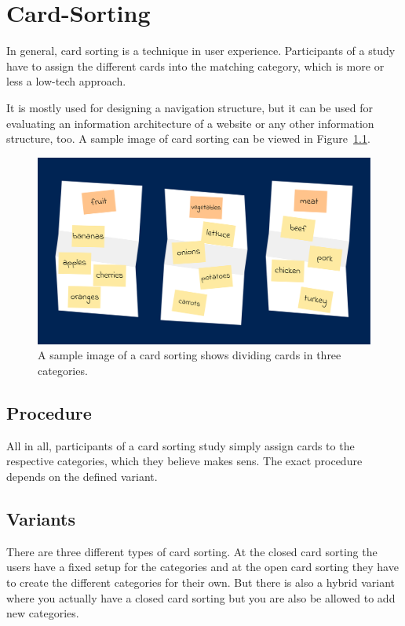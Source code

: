 \chapter{Card-Sorting}
\label{chap:Card-Sorting}

In general, card sorting is a technique in user experience. Participants 
of a study have to assign the different cards into the matching 
category, which is more or less a low-tech approach. 

It is mostly used for designing a navigation structure, but it can be used 
for evaluating an information architecture of a website or any other 
information structure, too.
A sample image of card sorting can be viewed in Figure~\ref{fig:sample}. 

\begin{figure}[tp]  \centering
\includegraphics[keepaspectratio,width=\linewidth,height=\halfh]{images/card-sorting/sample.png}
\caption[Sample Image of Card Sorting] 
{A sample image of a card sorting shows dividing cards in three categories.
 } 
\label{fig:sample} 
\end{figure}


\section{Procedure}
All in all, participants of a card sorting study simply assign cards to the 
respective categories, which they believe makes sens. The exact procedure 
depends on the defined variant. 


\section{Variants}
There are three different types of card sorting. At the closed card sorting 
the users have a fixed setup for the categories and at the open card sorting 
they have to create the different categories for their own. But there is also 
a hybrid variant where you actually have a closed card sorting but you are 
also be allowed to add new categories.  






